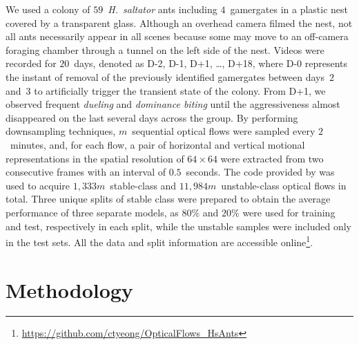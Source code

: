 \documentclass[letterpaper]{article} %
\begin{document}
We used a colony of $59$~\emph{H.~saltator} ants including $4$~gamergates 
in a plastic nest covered by a transparent glass. Although an overhead camera 
filmed the nest, not all ants necessarily appear in all scenes because some may 
move to an off-camera foraging chamber through a tunnel on the left side 
of the nest. 
Videos were recorded for $20$~days, denoted as D-2, D-1, D+1,
\dots, D+18, where D-0 represents the instant of removal of the previously  
identified gamergates between days~$2$ and~$3$ to artificially trigger
the transient state of the colony. From D+1, we observed frequent
\emph{dueling} and \emph{dominance biting} until the aggressiveness
almost disappeared on the last several days across the group. By
performing downsampling techniques, $m$~sequential optical flows were
sampled every $2$~minutes, and, for each flow, a pair of horizontal and
vertical motional representations in the spatial resolution of $64
\times 64$ were extracted from two consecutive frames with an interval
of $0.5$~seconds. The code provided by \citet{WXWQLTV16} was used to
acquire $1,333m$~stable-class and $11,984m$~unstable-class optical flows
in total. Three unique splits of stable class were prepared to obtain
the average performance of three separate models, as $80\%$ and $20\%$
were used for training and test, respectively in each split, while the
unstable samples were included only in the test sets. All the data and 
split information are accessible
online\footnote{\url{https://github.com/ctyeong/OpticalFlows_HsAnts}}.

\section{Methodology}
\label{sec:method}
\end{document}
